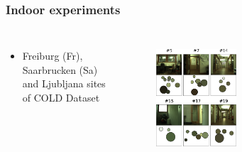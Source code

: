 {
	\frametitle{Indoor experiments}
	

	\begin{columns}[T]
		
		\small
		\begin{itemize}
			\item Freiburg (Fr), Saarbrucken (Sa) and Ljubljana sites of COLD Dataset
		\end{itemize}
		\centering
		\begin{figure}[p]
			\centering
			\vspace{-0.5cm}
			\includegraphics[width = 0.45\textwidth]{img/icsc/ssg-eval2}
			\label{fig:fr_ssg}
		\end{figure}
				

\end{columns}}
